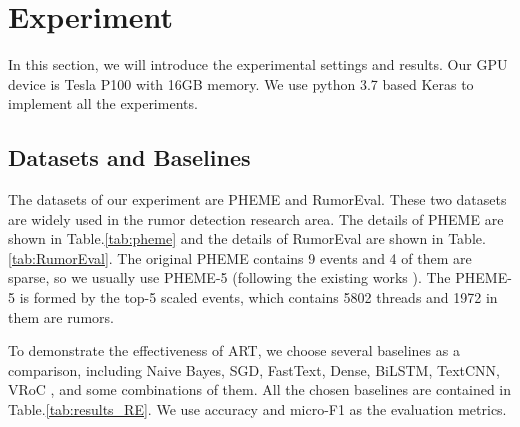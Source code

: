 \section{Experiment}
\label{sec:experiment}
In this section, we will introduce the experimental settings and results. Our GPU device is Tesla P100 with 16GB memory. We use python 3.7 based Keras to implement all the experiments.

\subsection{Datasets and Baselines}
\label{sec:dataset}
The datasets of our experiment are  PHEME \cite{DBLP:conf/coling/KochkinaLZ18} and RumorEval\cite{DBLP:conf/semeval/EnayetE17}. These two datasets are widely used in the rumor detection research area. The details of PHEME are shown in Table.\ref{tab:pheme} and the details of RumorEval are shown in Table.\ref{tab:RumorEval}. The original PHEME contains 9 events and 4 of them are sparse, so we usually use PHEME-5 (following the existing works \cite{DBLP:conf/www/ChengNB20}). The PHEME-5 is formed by the top-5 scaled events, which contains 5802 threads and 1972 in them are rumors. 

To demonstrate the effectiveness of ART, we choose several baselines as a comparison, including Naive Bayes, SGD, FastText, Dense, BiLSTM, TextCNN, VRoC \cite{DBLP:conf/www/ChengNB20}, and some combinations of them. All the chosen baselines are contained in Table.\ref{tab:results_RE}. We use accuracy and micro-F1 as the evaluation metrics.

\begin{table}[htbp]
	\caption{PHEME}
	\centering
	\label{tab:pheme}
\end{table}

